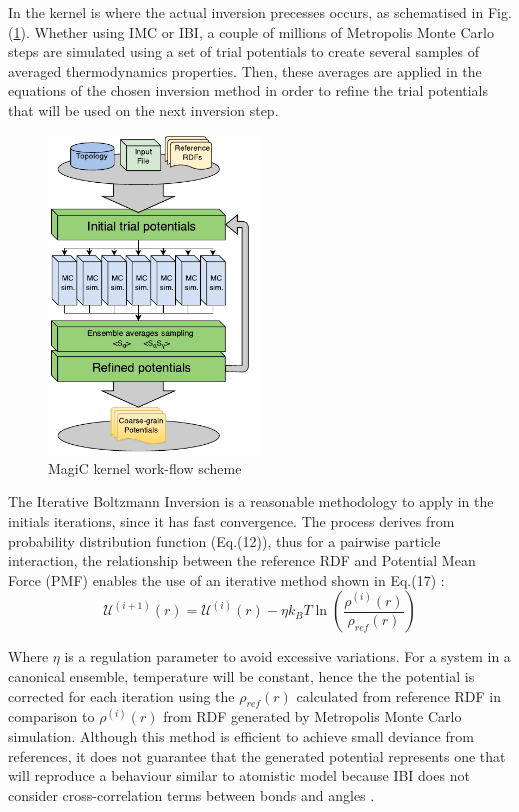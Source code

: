 \documentclass[10pt,a4paper,twoside]{article}
\begin{document}
 In the kernel is where the actual inversion precesses occurs, as schematised in Fig.(\ref{Fig:kernel}). Whether using IMC or IBI, a couple of millions of Metropolis Monte Carlo steps are simulated using a set of trial potentials to create several samples of averaged thermodynamics properties. Then, these averages are applied in the equations of the chosen inversion method in order to refine the trial potentials that will be used on the next inversion step.
 \begin{figure}[ht!]
  \begin{center}
	\includegraphics[width=0.50\textwidth]{./images/magiccore}
	\caption{MagiC kernel work-flow scheme}
	\label{Fig:kernel}
  \end{center}
\end{figure}
 
 The Iterative Boltzmann Inversion is a reasonable methodology to apply in the initials iterations, since it has fast convergence. The process derives from probability distribution function (Eq.(12)), thus for a pairwise particle interaction, the relationship between the reference RDF and Potential Mean Force (PMF) enables the use of an iterative method shown in Eq.(17) \cite{ibi}:
   \begin{equation}
\mathcal{U}^{(i+1)}(r) = \mathcal{U}^{(i)}(r) - \eta k_B T \ln{\left(\dfrac{\rho^{(i)}(r)}{\rho_{ref}(r)}\right)}
\label{eqn:ibi}
\end{equation}

 Where $\eta$ is a regulation parameter to avoid excessive variations. For a system in a canonical ensemble, temperature will be constant, hence the the potential is corrected for each iteration using the $\rho_{ref}(r)$ calculated from reference RDF in comparison to $\rho^{(i)}(r)$ from  RDF generated by Metropolis Monte Carlo simulation. Although this method is efficient to achieve small deviance from references, it does not guarantee that the generated potential represents one that will reproduce a behaviour similar to atomistic model because IBI does not consider cross-correlation terms between bonds and angles \cite{magic}.   
 
\end{document}
